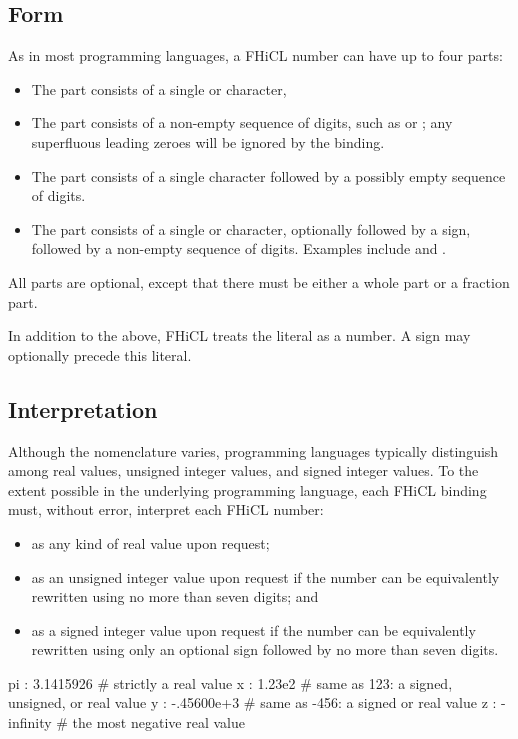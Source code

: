 \documentclass{memarticle}
\newcommand{\fhicl}%
 {FHiCL\xspace}
\begin{document}
\subsection{Form}

As in most programming languages,
a \fhicl number
can have up to four parts:
\begin{itemize}
  \item The  part consists of
        a single \fclcode{+} or \fclcode{-} character,
  \item The  part consists of
        a non-empty sequence of digits,
        such as  or ;
        any superfluous leading zeroes
        will be ignored by the binding.
  \item The  part consists of
        a single  character
        followed by
        a possibly empty sequence of digits.
  \item The  part consists of
        a single  or  character,
        optionally followed by a sign,
        followed by
        a non-empty sequence of digits.
        Examples include  and .
\end{itemize}
All parts are optional,
except that there must be
either a whole part or a fraction part.

In addition to the above,
\fhicl treats the literal 
as a number.
A sign
may optionally precede this literal.

\subsection{Interpretation}

Although the nomenclature varies,
programming languages typically distinguish
among real values, unsigned integer values, and signed integer values.
To the extent possible
in the underlying programming language,
each \fhicl binding
must, without error, interpret each \fhicl number:
\begin{itemize}
  \item as any kind of real value upon request;
  \item as an unsigned integer value upon request
        if the number can be equivalently rewritten
        using no more than seven digits;
  and
  \item as a signed integer value upon request
        if the number can be equivalently rewritten
        using only an optional \fclcode{-} sign
        followed by no more than seven digits.
\end{itemize}
\Needspace{0.67in}
\begin{fcllisting}[texcl,escapechar=`]
pi : 3.1415926   # strictly a real value
x  : 1.23e2      # same as 123: a signed, unsigned, or real value
y  : -.45600e+3  # same as -456: a signed or real value
z  : -infinity   # the most negative real value
\end{fcllisting}
\end{document}
